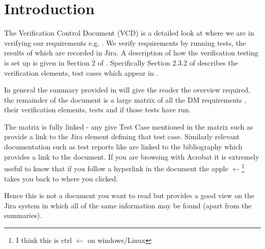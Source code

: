 
\section{Introduction}
\label{sec:intro}

The Verification Control Document (VCD) is a detailed look at where we are in verifying our requirements e.g. .
We verify requirements by
running tests, the results of which are recorded in Jira.  A description of how the verification testing is set up is given in Section 2 of .
Specifically Section 2.3.2 of  describes the verification elements, test cases which appear in .

In general the summary provided in  will give the reader the overview required, the remainder of the document is a large matrix of all the DM requirements , their verification elements, tests and if those tests have run.

The matrix is fully linked - any give Test Case mentioned in the matrix such as  provide a link to the Jira element defining that test case. Similarly relevant documentation such as test reports like  are linked to the bibliography which provides a link to the document.
If you are browsing with Acrobat it is extremely useful to know that if you follow a hyperlink in the document the  apple $\leftarrow$\footnote{I think this is ctrl $\leftarrow$ on windows/Linux} takes you back to where you clicked.

Hence this is not a document you want to read but provides a good view on the Jira system in which all of the same information may be found (apart from the summaries).
